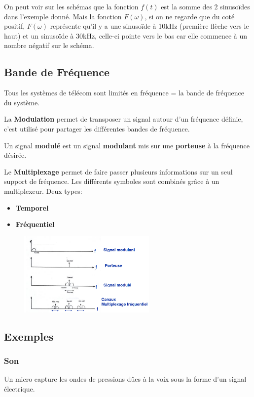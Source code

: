 		On peut voir sur les schémas que la fonction $f(t)$ est la somme des 2 sinusoïdes dans l'exemple donné. Mais la fonction $F(\omega)$, si on ne regarde que du coté positif, $F(\omega)$ représente qu'il y a une sinusoïde à 10kHz (première flèche vers le haut) et un sinusoïde à 30kHz, celle-ci pointe vers le bas car elle commence à un nombre négatif sur le schéma.
		
	\subsection{Bande de Fréquence}
		Tous les systèmes de télécom sont limités en fréquence = la bande de fréquence du système.
		
		La \textbf{Modulation} permet de transposer un signal autour d'un fréquence définie, c'est utilisé pour partager les différentes bandes de fréquence.
		
		Un signal \textbf{modulé} est un signal \textbf{modulant} mis sur une \textbf{porteuse} à la fréquence désirée.
		
		Le \textbf{Multiplexage} permet de faire passer plusieurs informations sur un seul support de fréquence. Les différents symboles sont combinés grâce à un multiplexeur. Deux types:
		\begin{itemize}
			\item \textbf{Temporel}
			\item \textbf{Fréquentiel}
		\end{itemize}
		\begin{figure}[H]
			\centering
			\includegraphics[width=0.6\textwidth]{img/Multiplexage.png}
		\end{figure}
	\subsection{Exemples}
		\subsubsection{Son}
			Un micro capture les ondes de pressions dûes à la voix sous la forme d'un signal électrique.
			
